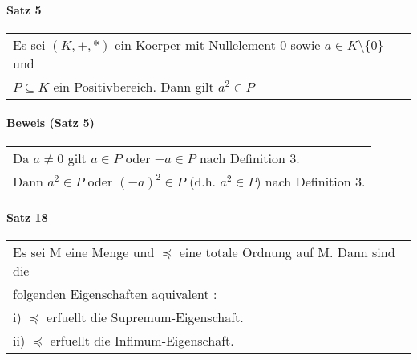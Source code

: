 \documentclass{scrartcl}
\begin{document}
\paragraph{Satz 5}
\begin{tabbing}
\begin{tabular}{l}
Es sei $(K,+,*)$ ein Koerper mit Nullelement 0 sowie $a\in K\setminus\{ 0\}$ und \\
$P \subseteq K$ ein Positivbereich. Dann gilt $a^2\in P$
\end{tabular}
\end{tabbing}

\paragraph{Beweis (Satz 5)}
\begin{tabbing}
\begin{tabular}{l}
Da $a\neq 0$ gilt $a\in P$ oder $-a\in P$ nach Definition 3.\\
Dann $a^2\in P$ oder $(-a)^2\in P$ (d.h. $a^2\in P$) nach Definition 3.
\end{tabular}
\end{tabbing}










\paragraph{Satz 18}
\begin{tabbing}
\begin{tabular}{l}
Es sei M eine Menge und $ \preceq $ eine totale Ordnung auf M. Dann sind die\\
folgenden Eigenschaften aquivalent : \\
i) $ \preceq $ erfuellt die Supremum-Eigenschaft.\\
ii) $ \preceq $ erfuellt die Infimum-Eigenschaft.
\end{tabular}
\end{tabbing}
\end{document}
